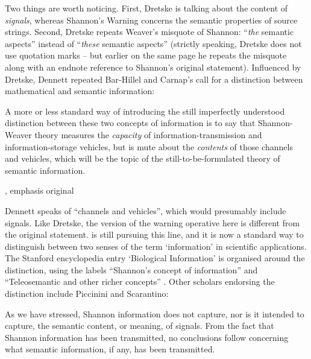 \noindent Two things are worth noticing.
First, Dretske is talking about the content of \textit{signals}, whereas {\sc Shannon's Warning} concerns the semantic properties of source strings.
Second, Dretske repeats Weaver's misquote of Shannon: ``\textit{the} semantic aspects'' instead of ``\textit{these} semantic aspects'' (strictly speaking, Dretske does not use quotation marks -- but earlier on the same page he repeats the misquote along with an endnote reference to Shannon's original statement).
Influenced by Dretske, Dennett repeated Bar-Hillel and Carnap's call for a distinction between mathematical and semantic information:

\begin{myquote}
A more or less standard way of introducing the still imperfectly understood distinction between these two concepts of information is to say that Shannon-Weaver theory measures the \emph{capacity} of information-transmission and information-storage vehicles, but is mute about the \emph{contents} of those channels and vehicles, which will be the topic of the still-to-be-formulated theory of semantic information.
\par\hspace*{\fill}\citet[344]{dennett1983intentional}, emphasis original
\end{myquote}

\noindent Dennett speaks of ``channels and vehicles'', which would presumably include signals.
Like Dretske, the version of the warning operative here is different from the original statement.
\citet[$\S$6]{dennett2017bacteria} is still pursuing this line, and it is now a standard way to 
distinguish between two senses of the term `information' in scientific applications.
The Stanford encyclopedia entry `Biological Information' is organised around the distinction, using the labels ``Shannon's concept of information'' and ``Teleosemantic and other richer concepts'' \citep{godfrey-smith2016biological}.
Other scholars endorsing the distinction include Piccinini and Scarantino:

\begin{myquote}
As we have stressed, Shannon information does not capture, nor is it intended to capture, the semantic content, or meaning, of signals. From the fact that Shannon information has been transmitted, no conclusions follow concerning what semantic information, if any, has been transmitted.
\par\hspace*{\fill}\citet[21]{piccinini2011information}
\end{myquote}

